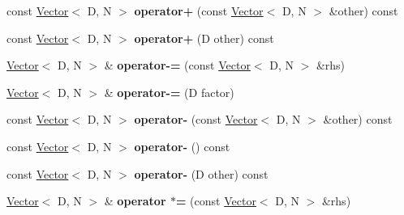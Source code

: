\begin{DoxyCompactItemize}
\item 
\mbox{\label{classrev_1_1_vector_ab491d547fe896254250273b482dd87c5}} 
const \mbox{\hyperlink{classrev_1_1_vector}{Vector}}$<$ D, N $>$ {\bfseries operator+} (const \mbox{\hyperlink{classrev_1_1_vector}{Vector}}$<$ D, N $>$ \&other) const
\item 
\mbox{\label{classrev_1_1_vector_ae5d5a2322835ed8b05578792b09a8549}} 
const \mbox{\hyperlink{classrev_1_1_vector}{Vector}}$<$ D, N $>$ {\bfseries operator+} (D other) const
\item 
\mbox{\label{classrev_1_1_vector_a59702de57fdfe1917ad16a8420aa4c13}} 
\mbox{\hyperlink{classrev_1_1_vector}{Vector}}$<$ D, N $>$ \& {\bfseries operator-\/=} (const \mbox{\hyperlink{classrev_1_1_vector}{Vector}}$<$ D, N $>$ \&rhs)
\item 
\mbox{\label{classrev_1_1_vector_a41913f8fe673e5108308ba0804e167ff}} 
\mbox{\hyperlink{classrev_1_1_vector}{Vector}}$<$ D, N $>$ \& {\bfseries operator-\/=} (D factor)
\item 
\mbox{\label{classrev_1_1_vector_adef771256430b6178b6b3234057e2709}} 
const \mbox{\hyperlink{classrev_1_1_vector}{Vector}}$<$ D, N $>$ {\bfseries operator-\/} (const \mbox{\hyperlink{classrev_1_1_vector}{Vector}}$<$ D, N $>$ \&other) const
\item 
\mbox{\label{classrev_1_1_vector_acadca15db9b9e7d9e4580bea2677585f}} 
const \mbox{\hyperlink{classrev_1_1_vector}{Vector}}$<$ D, N $>$ {\bfseries operator-\/} () const
\item 
\mbox{\label{classrev_1_1_vector_a28dedf01b335b3d8473c038415dfd9f4}} 
const \mbox{\hyperlink{classrev_1_1_vector}{Vector}}$<$ D, N $>$ {\bfseries operator-\/} (D other) const
\item 
\mbox{\label{classrev_1_1_vector_a52ef9d416f45a76a48750f986b32f470}} 
\mbox{\hyperlink{classrev_1_1_vector}{Vector}}$<$ D, N $>$ \& {\bfseries operator $\ast$=} (const \mbox{\hyperlink{classrev_1_1_vector}{Vector}}$<$ D, N $>$ \&rhs)
\item 
\mbox{\label{classrev_1_1_vector_a092b588881b9f889d638d94b3e2c1fc0}} 

\end{DoxyCompactItemize}
